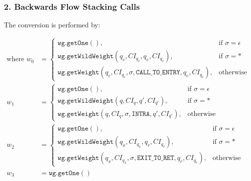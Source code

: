 \subsubsection{2. Backwards Flow Stacking Calls}

\noindent The conversion is performed by:

\begin{changebar}

\begin{align*}
\text{where }
w_0 &= \begin{cases}
           \mathtt{wg.getOne}(), & \text{if } \sigma = \epsilon \\
           \mathtt{wg.getWildWeight}(q_c,CI_{q_c},q_e,CI_{q_e}), & \text{if } \sigma = \text{*} \\
           \mathtt{wg.getWeight}(q_c,CI_{q_c},\sigma, \mathtt{CALL\_TO\_ENTRY},q_e,CI_{q_e}), & \text{otherwise}
      \end{cases} \\
w_1 &= \begin{cases}
           \mathtt{wg.getOne}(), & \text{if } \sigma = \epsilon \\
           \mathtt{wg.getWildWeight}(q,CI_q,q',CI_{q'}), & \text{if } \sigma = \text{*} \\
           \mathtt{wg.getWeight}(q,CI_q,\sigma, \mathtt{INTRA},q',CI_{q'}), & \text{otherwise}
       \end{cases} \\
w_2 &= \begin{cases}
          \mathtt{wg.getOne}(), & \text{if } \sigma = \epsilon \\
          \mathtt{wg.getWildWeight}(q_x,CI_{q_x},q_r,CI_{q_r}), & \text{if } \sigma = \text{*} \\
          \mathtt{wg.getWeight}(q_x,CI_{q_x},\sigma, \mathtt{EXIT\_TO\_RET},q_r,CI_{q_r}), & \text{otherwise}
      \end{cases} \\
w_3 &= \mathtt{wg.getOne}()
\end{align*}


\end{changebar}

